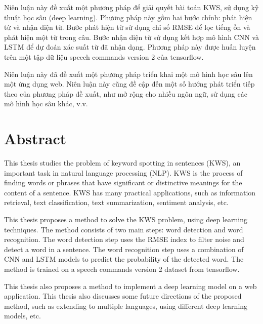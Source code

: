 Niên luận này đề xuất một phương pháp để giải quyết bài toán KWS, sử dụng kỹ thuật học sâu (deep learning). Phương pháp này gồm hai bước chính: phát hiện từ và nhận diện từ. Bước phát hiện từ  sử dụng chỉ số RMSE để lọc tiếng ồn và phát hiện một từ trong câu. Bước nhận diện từ sử dụng kết hợp mô hình CNN và LSTM để dự đoán xác suất từ đã nhận dạng. Phương pháp này được huấn luyện trên một tập dữ liệu speech commands version 2 của tensorflow. 

Niên luận này đã đề xuất một phương pháp triển khai một mô hình học sâu lên một ứng dụng web. Niên luận này cũng đề cập đến một số hướng phát triển tiếp theo của phương pháp đề xuất, như mở rộng cho nhiều ngôn ngữ, sử dụng các mô hình học sâu khác, v.v.  \par
\cleardoublepage

\chapter*{Abstract}
This thesis studies the problem of keyword spotting in sentences (KWS), an important task in natural language processing (NLP). KWS is the process of finding words or phrases that have significant or distinctive meanings for the content of a sentence. KWS has many practical applications, such as information retrieval, text classification, text summarization, sentiment analysis, etc.

This thesis proposes a method to solve the KWS problem, using deep learning techniques. The method consists of two main steps: word detection and word recognition. The word detection step uses the RMSE index to filter noise and detect a word in a sentence. The word recognition step uses a combination of CNN and LSTM models to predict the probability of the detected word. The method is trained on a speech commands version 2 dataset from tensorflow.

This thesis also proposes a method to implement a deep learning model on a web application. This thesis also discusses some future directions of the proposed method, such as extending to multiple languages, using different deep learning models, etc.\par
\cleardoublepage